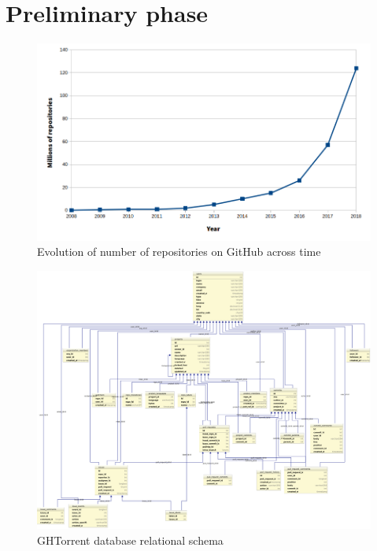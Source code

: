 \documentclass[a4paper, 12pt]{book}
\begin{document}
\section{Preliminary phase}
\label{sec:fase-preliminar}
\begin{figure}
  \centering
  \includegraphics[width=14cm, keepaspectratio]{img/number-github-repos}
  \caption{Evolution of number of repositories on GitHub across time}
  \label{fig:total-repo-number}
\end{figure}
\begin{figure}
  \centering
  \includegraphics[width=16cm, keepaspectratio]{img/ghtorrent-schema}
  \caption{GHTorrent database relational schema}
  \label{fig:ghtorrent-schema}
\end{figure}
\end{document}
